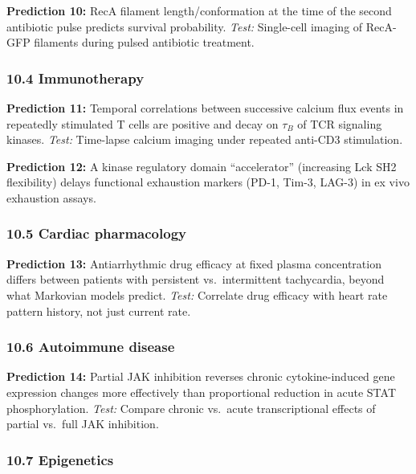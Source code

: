 \documentclass[
  11pt,
]{article}
\begin{document}
\textbf{Prediction 10:} RecA filament length/conformation at the time of
the second antibiotic pulse predicts survival probability. \emph{Test:}
Single-cell imaging of RecA-GFP filaments during pulsed antibiotic
treatment.

\hypertarget{immunotherapy}{%
\subsubsection{10.4 Immunotherapy}\label{immunotherapy}}

\textbf{Prediction 11:} Temporal correlations between successive calcium
flux events in repeatedly stimulated T cells are positive and decay on
\(\tau_B\) of TCR signaling kinases. \emph{Test:} Time-lapse calcium
imaging under repeated anti-CD3 stimulation.

\textbf{Prediction 12:} A kinase regulatory domain ``accelerator''
(increasing Lck SH2 flexibility) delays functional exhaustion markers
(PD-1, Tim-3, LAG-3) in ex vivo exhaustion assays.

\hypertarget{cardiac-pharmacology-1}{%
\subsubsection{10.5 Cardiac pharmacology}\label{cardiac-pharmacology-1}}

\textbf{Prediction 13:} Antiarrhythmic drug efficacy at fixed plasma
concentration differs between patients with persistent vs.~intermittent
tachycardia, beyond what Markovian models predict. \emph{Test:}
Correlate drug efficacy with heart rate pattern history, not just
current rate.

\hypertarget{autoimmune-disease-1}{%
\subsubsection{10.6 Autoimmune disease}\label{autoimmune-disease-1}}

\textbf{Prediction 14:} Partial JAK inhibition reverses chronic
cytokine-induced gene expression changes more effectively than
proportional reduction in acute STAT phosphorylation. \emph{Test:}
Compare chronic vs.~acute transcriptional effects of partial vs.~full
JAK inhibition.

\hypertarget{epigenetics}{%
\subsubsection{10.7 Epigenetics}\label{epigenetics}}
\end{document}
